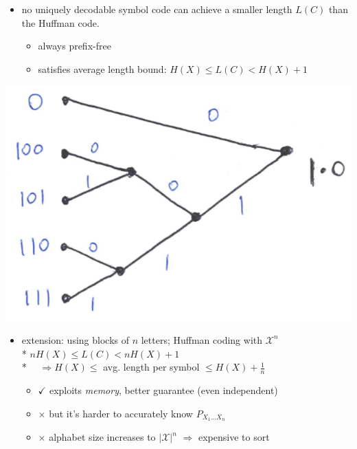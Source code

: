 \documentclass[10pt, landscape]{article}
\begin{document}
\begin{multicols*}{4}
  \begin{minipage}[c]{0.6\linewidth}\color{black}
    \begin{itemize}
      \item no uniquely decodable symbol code can achieve a smaller length $L(C)$ than the Huffman code.
        \begin{itemize}
          \item always prefix-free
          \item satisfies average length bound:
            $H(X) \leq L(C) < H(X) + 1$
        \end{itemize}
    \end{itemize}
  \end{minipage}
  \begin{minipage}[c]{0.37\linewidth}
    \includegraphics[width=\linewidth]{cd3236-huffman-code-tree.png} 
  \end{minipage}

  \begin{itemize}
    \item extension: using blocks of $n$ letters; Huffman coding with $\mathcal{X}^n$ 
      \\* $nH(X) \leq L(C) < nH(X) + 1$
      \\* $\quad \Rightarrow H(X) \leq$ avg. length per symbol $\leq H(X) + \frac{1}{n}$
      \begin{itemize}
        \item $\checkmark$ exploits \textit{memory}, better guarantee (even independent)
        \item $\times$ but it's harder to accurately know $P_{X_1 \dots X_n}$
        \item $\times$  alphabet size increases to $\vert \mathcal{X} \vert^n$ $\Rightarrow$ expensive to sort
      \end{itemize}
  \end{itemize}



\end{multicols*}
\end{document}
